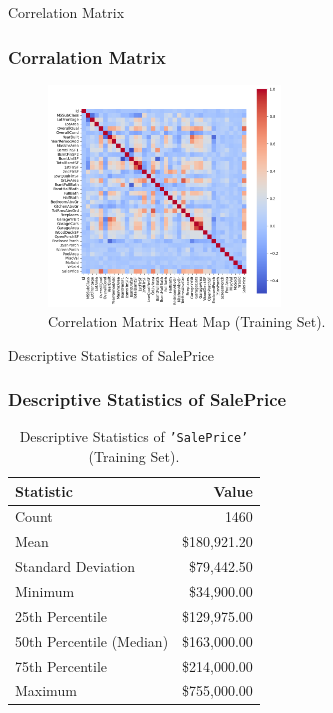 \begin{frame}{Correlation Matrix}
    \frametitle{Corralation Matrix}
    \begin{figure}
        \includegraphics[width=0.55\textwidth]{figures/correlation_matrix.png} 
        \caption{Correlation Matrix Heat Map (Training Set).}
        \label{fig:correlation_matrix}
    \end{figure}
\end{frame}

\begin{frame}{Descriptive Statistics of SalePrice}
    \frametitle{Descriptive Statistics of SalePrice}
    \begin{table}[H]
        \centering
        \begin{tabular}{|l|r|}
        \hline
        \textbf{Statistic} & \textbf{Value} \\
        \hline
        Count & 1460 \\
        Mean & \$180,921.20 \\
        Standard Deviation & \$79,442.50 \\
        Minimum & \$34,900.00 \\
        25th Percentile & \$129,975.00 \\
        50th Percentile (Median) & \$163,000.00 \\
        75th Percentile & \$214,000.00 \\
        Maximum & \$755,000.00 \\
        \hline
        \end{tabular}
        \caption{Descriptive Statistics of \texttt{'SalePrice'} (Training Set).}
        \label{tab:saleprice_stats}
    \end{table}        
\end{frame}

